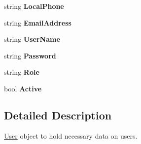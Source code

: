 \begin{DoxyCompactItemize}
\item 
string {\bfseries Local\+Phone}\hypertarget{class_business_objects_1_1_user_af8541ccaa5d8ea7bd9a9b2ef4be98628}{}\label{class_business_objects_1_1_user_af8541ccaa5d8ea7bd9a9b2ef4be98628}

\item 
string {\bfseries Email\+Address}\hypertarget{class_business_objects_1_1_user_a41f5ad9be3a1dbc01343ffaf71315580}{}\label{class_business_objects_1_1_user_a41f5ad9be3a1dbc01343ffaf71315580}

\item 
string {\bfseries User\+Name}\hypertarget{class_business_objects_1_1_user_a3b67463b53401175403f5d992aa0412c}{}\label{class_business_objects_1_1_user_a3b67463b53401175403f5d992aa0412c}

\item 
string {\bfseries Password}\hypertarget{class_business_objects_1_1_user_abec2ef8d60373887ab9d14219edb41e2}{}\label{class_business_objects_1_1_user_abec2ef8d60373887ab9d14219edb41e2}

\item 
string {\bfseries Role}\hypertarget{class_business_objects_1_1_user_a6e004323033c69f0d9bfd1d5daf7317f}{}\label{class_business_objects_1_1_user_a6e004323033c69f0d9bfd1d5daf7317f}

\item 
bool {\bfseries Active}\hypertarget{class_business_objects_1_1_user_aa87073276abad34a1a39176a19fcabc3}{}\label{class_business_objects_1_1_user_aa87073276abad34a1a39176a19fcabc3}

\end{DoxyCompactItemize}


\subsection{Detailed Description}
\hyperlink{class_business_objects_1_1_user}{User} object to hold necessary data on users. 




